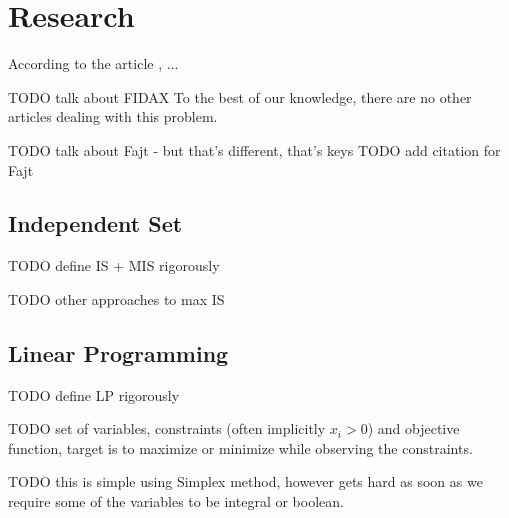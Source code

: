 \chapter{Research}

According to the article \cite{fidax}, ...

TODO talk about FIDAX
To the best of our knowledge, there are no other articles dealing with this problem.

TODO talk about Fajt - but that's different, that's keys
TODO add citation for Fajt

\section{Independent Set}

TODO define IS + MIS rigorously

TODO other approaches to max IS

\section{Linear Programming}

TODO define LP rigorously

TODO set of variables, constraints (often implicitly $x_i > 0$) and objective function, target is to maximize or minimize while observing the constraints.

TODO this is simple using Simplex method, however gets hard as soon as we require some of the variables to be integral or boolean.